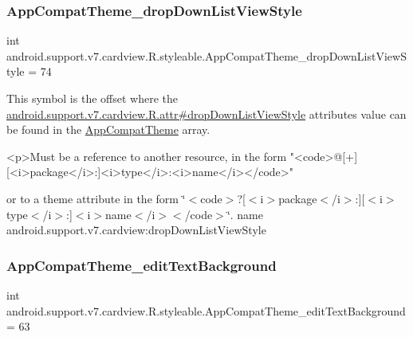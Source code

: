 \subsubsection{\texorpdfstring{App\+Compat\+Theme\+\_\+drop\+Down\+List\+View\+Style}{AppCompatTheme\_dropDownListViewStyle}}
{\footnotesize\ttfamily int android.\+support.\+v7.\+cardview.\+R.\+styleable.\+App\+Compat\+Theme\+\_\+drop\+Down\+List\+View\+Style = 74\hspace{0.3cm}{\ttfamily [static]}}

This symbol is the offset where the \hyperlink{classandroid_1_1support_1_1v7_1_1cardview_1_1R_1_1attr_a0ebf51c52ff5aa7a4447b55246bd588d}{android.\+support.\+v7.\+cardview.\+R.\+attr\#drop\+Down\+List\+View\+Style} attribute\textquotesingle{}s value can be found in the \hyperlink{classandroid_1_1support_1_1v7_1_1cardview_1_1R_1_1styleable_a52e6f69f954ecc2622d72c0b4d298938}{App\+Compat\+Theme} array.

\begin{DoxyVerb}      <p>Must be a reference to another resource, in the form "<code>@[+][<i>package</i>:]<i>type</i>:<i>name</i></code>"
\end{DoxyVerb}
 or to a theme attribute in the form \char`\"{}$<$code$>$?\mbox{[}$<$i$>$package$<$/i$>$\+:\mbox{]}\mbox{[}$<$i$>$type$<$/i$>$\+:\mbox{]}$<$i$>$name$<$/i$>$$<$/code$>$\char`\"{}.  name android.\+support.\+v7.\+cardview\+:drop\+Down\+List\+View\+Style \mbox{\label{classandroid_1_1support_1_1v7_1_1cardview_1_1R_1_1styleable_a4aa486808b398010c0add74652864333}} 
\subsubsection{\texorpdfstring{App\+Compat\+Theme\+\_\+edit\+Text\+Background}{AppCompatTheme\_editTextBackground}}
{\footnotesize\ttfamily int android.\+support.\+v7.\+cardview.\+R.\+styleable.\+App\+Compat\+Theme\+\_\+edit\+Text\+Background = 63\hspace{0.3cm}{\ttfamily [static]}}

